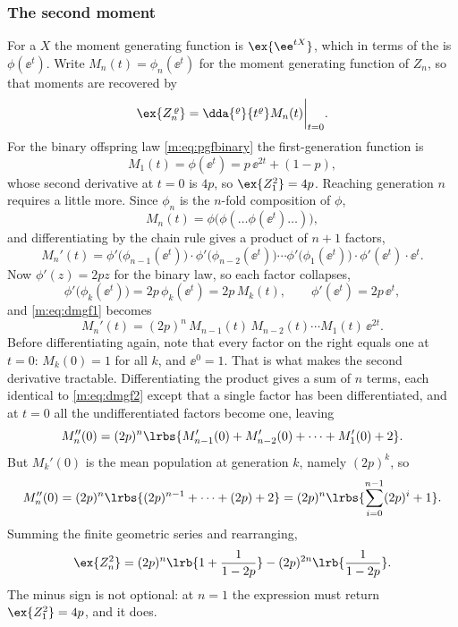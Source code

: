 \subsubsection{The second moment}

For a \rv{} $X$ the moment generating function is $\ex{\ee^{tX}}$, which in terms
of the \pgf{} is $\phi(\ee^t)$. Write $M_n(t) = \phi_n(\ee^t)$ for the moment
generating function of $Z_n$, so that moments are recovered by
\begin{equation}
\label{m:eq:mgfmoments}
\ex{Z_n^{\,\varrho}} = \dda{^{\varrho}}{t^{\varrho}}M_n(t)\bigg|_{t=0} .
\end{equation}
For the binary offspring law \cref{m:eq:pgfbinary} the first-generation function is
\begin{equation}
\label{m:eq:mgf1}
M_1(t) = \phi(\ee^t) = p\,\ee^{2t} + (1-p),
\end{equation}
whose second derivative at $t=0$ is $4p$, so $\ex{Z_1^2}=4p$. Reaching generation
$n$ requires a little more. Since $\phi_n$ is the $n$-fold composition of $\phi$,
\begin{equation*}
M_n(t) = \phi\bigl(\phi(\dots\phi(\ee^t)\dots)\bigr),
\end{equation*}
and differentiating by the chain rule gives a product of $n+1$ factors,
\begin{equation}
\label{m:eq:dmgf1}
M_n'(t) = \phi'\bigl(\phi_{n-1}(\ee^t)\bigr)\cdot\phi'\bigl(\phi_{n-2}(\ee^t)\bigr)
\cdots\phi'\bigl(\phi_1(\ee^t)\bigr)\cdot\phi'(\ee^t)\cdot\ee^t .
\end{equation}
Now $\phi'(z) = 2pz$ for the binary law, so each factor collapses,
\begin{equation*}
\phi'\bigl(\phi_k(\ee^t)\bigr) = 2p\,\phi_k(\ee^t) = 2p\,M_k(t),
\qquad
\phi'(\ee^t) = 2p\,\ee^t ,
\end{equation*}
and \cref{m:eq:dmgf1} becomes
\begin{equation}
\label{m:eq:dmgf2}
M_n'(t) = (2p)^n\,M_{n-1}(t)\,M_{n-2}(t)\cdots M_1(t)\,\ee^{2t} .
\end{equation}
Before differentiating again, note that every factor on the right equals one at
$t=0$: $M_k(0)=1$ for all $k$, and $\ee^0=1$. That is what makes the second
derivative tractable. Differentiating the product gives a sum of $n$ terms, each
identical to \cref{m:eq:dmgf2} except that a single factor has been differentiated,
and at $t=0$ all the undifferentiated factors become one, leaving
\begin{equation*}
M_n''(0) = (2p)^n\lrbs{M_{n-1}'(0) + M_{n-2}'(0) + \cdots + M_1'(0) + 2}.
\end{equation*}
But $M_k'(0)$ is the mean population at generation $k$, namely $(2p)^k$, so
\begin{equation*}
M_n''(0) = (2p)^n\lrbs{(2p)^{n-1} + \cdots + (2p) + 2}
= (2p)^n\lrbs{\sum_{i=0}^{n-1}(2p)^i + 1}.
\end{equation*}
Summing the finite geometric series and rearranging,
\begin{equation}
\label{m:eq:secondMoment}
\ex{Z_n^2} = (2p)^n\lrb{1+\frac{1}{1-2p}} - (2p)^{2n}\lrb{\frac{1}{1-2p}} .
\end{equation}
The minus sign is not optional: at $n=1$ the expression must return
$\ex{Z_1^2}=4p$, and it does.

